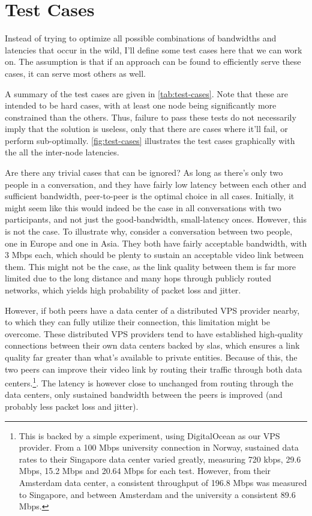 \chapter{Test Cases}\label{chp:test-cases}

Instead of trying to optimize all possible combinations of bandwidths and latencies that occur in the wild, I'll define some test cases here that we can work on. The assumption is that if an approach can be found to efficiently serve these cases, it can serve most others as well.

A summary of the test cases are given in \autoref{tab:test-cases}. Note that these are intended to be hard cases, with at least one node being significantly more constrained than the others. Thus, failure to pass these tests do not necessarily imply that the solution is useless, only that there are cases where it'll fail, or perform sub-optimally. \autoref{fig:test-cases} illustrates the test cases graphically with the all the inter-node latencies.

Are there any trivial cases that can be ignored? As long as there's only two people in a conversation, and they have fairly low latency between each other and sufficient bandwidth, peer-to-peer is the optimal choice in all cases. Initially, it might seem like this would indeed be the case in all conversations with two participants, and not just the good-bandwidth, small-latency onces. However, this is not the case. To illustrate why, consider a conversation between two people, one in Europe and one in Asia. They both have fairly acceptable bandwidth, with 3 Mbps each, which should be plenty to sustain an acceptable video link between them. This might not be the case, as the link quality between them is far more limited due to the long distance and many hops through publicly routed networks, which yields high probability of packet loss and jitter.

However, if both peers have a data center of a distributed VPS provider nearby, to which they can fully utilize their connection, this limitation might be overcome. These distributed VPS providers tend to have established high-quality connections between their own data centers backed by \glspl{sla}, which ensures a link quality far greater than what's available to private entities. Because of this, the two peers can improve their video link by routing their traffic through both data centers.\footnote{This is backed by a simple experiment, using DigitalOcean as our VPS provider. From a 100 Mbps university connection in Norway, sustained data rates to their Singapore data center varied greatly, measuring 720 kbps, 29.6 Mbps, 15.2 Mbps and 20.64 Mbps for each test. However, from their Amsterdam data center, a consistent throughput of 196.8 Mbps was measured to Singapore, and between Amsterdam and the university a consistent 89.6 Mbps.}. The latency is however close to unchanged from routing through the data centers, only sustained bandwidth between the peers is improved (and probably less packet loss and jitter).

